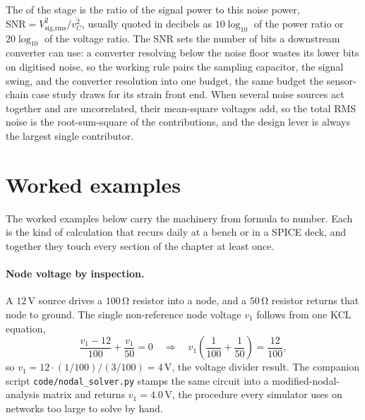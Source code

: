 The  of the stage is the ratio of the
signal power to this noise power, $\text{SNR} = V_{\text{sig,rms}}^{2}/
\overline{v_C^{2}}$, usually quoted in decibels as $10\log_{10}$ of the
power ratio or $20\log_{10}$ of the voltage ratio. The SNR sets the number
of bits a downstream converter can use: a converter resolving below the
noise floor wastes its lower bits on digitised noise, so the working rule
pairs the sampling capacitor, the signal swing, and the converter
resolution into one budget, the same budget the sensor-chain case study
draws for its strain front end. When several noise sources act together
and are uncorrelated, their mean-square voltages add, so the total RMS
noise is the root-sum-square of the contributions, and the design lever is
always the largest single contributor.

\section{Worked examples}

The worked examples below carry the machinery from formula to number.
Each is the kind of calculation that recurs daily at a bench or in a
SPICE deck, and together they touch every section of the chapter at
least once.

\paragraph{Node voltage by inspection.}
A $12\,\si{\volt}$ source drives a $100\,\si{\ohm}$ resistor into a
node, and a $50\,\si{\ohm}$ resistor returns that node to ground. The
single non-reference node voltage $v_{1}$ follows from one KCL
equation,
\[
\frac{v_{1}-12}{100} + \frac{v_{1}}{50} = 0
\quad\Longrightarrow\quad
v_{1}\left(\frac{1}{100}+\frac{1}{50}\right) = \frac{12}{100},
\]
so $v_{1} = 12\cdot(1/100)/(3/100) = 4\,\si{\volt}$, the voltage
divider result. The companion script
\texttt{code/nodal\_solver.py} stamps the
same circuit into a modified-nodal-analysis matrix and returns
$v_{1}=4.0\,\si{\volt}$, the procedure every simulator uses on
networks too large to solve by hand.

